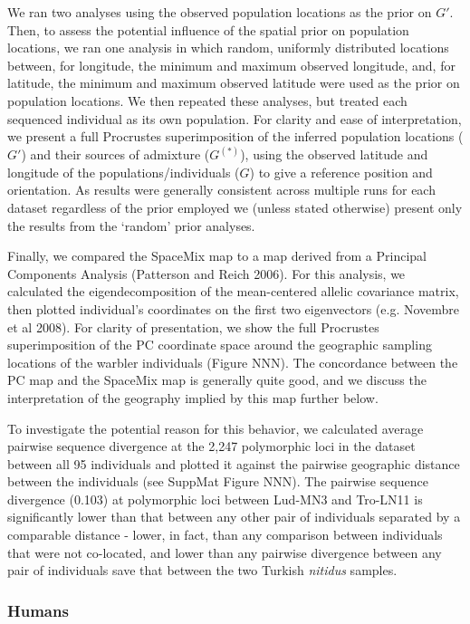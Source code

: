 \documentclass[12pt]{article}
\newcommand{\admixsource}[1]{{$G^{(*)}$}}
\begin{document}
We ran two analyses using the observed population locations as the prior on $G'$.  Then, to assess the potential influence of the spatial prior on population locations, we ran one analysis in which random, uniformly distributed locations between, for longitude, the minimum and maximum observed longitude, and, for latitude, the minimum and maximum observed latitude were used as the prior on population locations.  We then repeated these analyses, but treated each sequenced individual as its own population.  For clarity and ease of interpretation, we present a full Procrustes superimposition of the inferred population locations ($G'$) and their sources of admixture (\admixsource{}), using the observed latitude and longitude of the populations/individuals ($G$) to give a reference position and orientation.  As results were generally consistent across multiple runs for each dataset regardless of the prior employed we (unless stated otherwise) present only the results from the `random' prior analyses.

Finally, we compared the SpaceMix map to a map derived from a Principal Components Analysis (Patterson and Reich 2006).  For this analysis, we calculated the eigendecomposition of the mean-centered allelic covariance matrix, then plotted individual's coordinates on the first two eigenvectors (e.g. Novembre et al 2008).  For clarity of presentation, we show the full Procrustes superimposition of the PC coordinate space around the geographic sampling locations of the warbler individuals (Figure NNN).  The concordance between the PC map and the SpaceMix map is generally quite good, and we discuss the interpretation of the geography implied by this map further below.

To investigate the potential reason for this behavior, we calculated average pairwise sequence divergence at the 2,247 polymorphic loci in the dataset between all 95 individuals and plotted it against the pairwise geographic distance between the individuals (see SuppMat Figure NNN).  The pairwise sequence divergence (0.103) at polymorphic loci between Lud-MN3 and Tro-LN11 is significantly lower than that between any other pair of individuals separated by a comparable distance - lower, in fact, than any comparison between individuals that were not co-located, and lower than any pairwise divergence between any pair of individuals save that between the two Turkish \textit{nitidus} samples. 

\subsubsection*{Humans}
\end{document}

